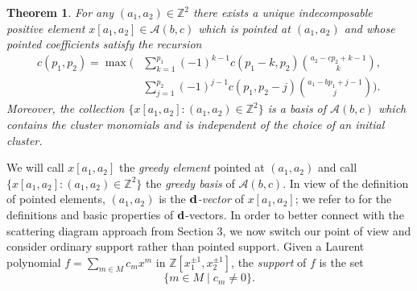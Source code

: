 \documentclass[11pt]{amsart}
\newtheorem{theorem}{Theorem}[section]
\theoremstyle{remark}
\numberwithin{equation}{section}
\newcommand{\ZZ}{\mathbb{Z}}
\newcommand{\cA}{\mathcal{A}}
\newcommand{\bfd}{{\bf d}}
\begin{document}
\begin{theorem}\label{th:greedy}\cite[Theorem~1.7]{LLZ}
  For any $(a_1,a_2)\in\ZZ^2$ there exists a unique indecomposable positive
  element $x[a_1,a_2]\in\cA(b,c)$ which is pointed at $(a_1,a_2)$ and whose
  pointed coefficients satisfy the recursion
  \begin{align}
    \label{eq:greedy recursion}
    c(p_1,p_2)=\max\bigg(
    &\sum\limits_{k=1}^{p_1} (-1)^{k-1}c(p_1-k,p_2){a_2-cp_2+k-1\choose k},\\
    \nonumber&\sum\limits_{ j =1}^{p_2} (-1)^{ j -1}c(p_1,p_2- j ){a_1-bp_1+ j -1\choose  j }\bigg).
  \end{align}
  Moreover, the collection $\{x[a_1,a_2]:(a_1,a_2)\in\ZZ^2\}$ is a basis of
  $\cA(b,c)$ which contains the cluster monomials and is independent of the
  choice of an initial cluster.
\end{theorem}
We will call $x[a_1,a_2]$ the \emph{greedy element} pointed at $(a_1,a_2)$ and
call $\{x[a_1,a_2]:(a_1,a_2)\in\ZZ^2\}$ the \emph{greedy basis} of $\cA(b,c)$. 
In view of the definition of pointed elements, $(a_1,a_2)$ is the
\emph{$\bfd$-vector} of $x[a_1,a_2]$; we refer to \cite{FZ4} for the
 definitions and basic properties of $\bfd$-vectors.
In order to better connect with the scattering diagram approach from Section 3, we now switch our point of view and consider ordinary support rather than pointed support.  Given a Laurent polynomial $f=\sum_{m\in M}c_mx^m$ in $\ZZ[x_1^{\pm1},x_2^{\pm1}]$, the \emph{support} of $f$ is the set
\[ \{m\in M \mid c_m\neq 0\}. \]
\end{document}
